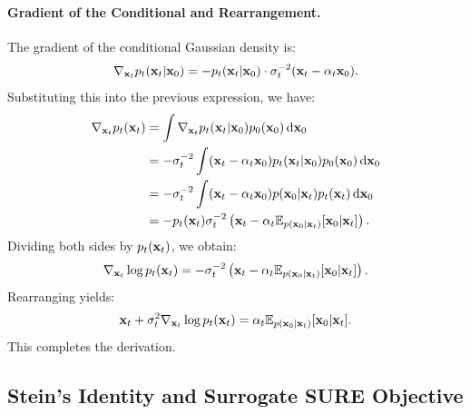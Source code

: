 \paragraph{Gradient of the Conditional and Rearrangement.}
The gradient of the conditional Gaussian density is:
\begin{align*}
\nabla_{{\mathbf{x}}_t} p_t({\mathbf{x}}_t|{\mathbf{x}}_0) 
= -p_t({\mathbf{x}}_t|{\mathbf{x}}_0) \cdot \sigma_t^{-2} ({\mathbf{x}}_t - \alpha_t {\mathbf{x}}_0).
\end{align*}
Substituting this into the previous expression, we have:
\begin{align*}
\nabla_{{\mathbf{x}}_t} p_t({\mathbf{x}}_t) 
&= \int \nabla_{{\mathbf{x}}_t} p_t({\mathbf{x}}_t|{\mathbf{x}}_0)  p_0({\mathbf{x}}_0)  \mathop{}\!\mathrm{d}{\mathbf{x}}_0 \\
&= -\sigma_t^{-2} \int ({\mathbf{x}}_t - \alpha_t {\mathbf{x}}_0)  p_t({\mathbf{x}}_t|{\mathbf{x}}_0)  p_0({\mathbf{x}}_0)  \mathop{}\!\mathrm{d}{\mathbf{x}}_0 \\
&= -\sigma_t^{-2} \int ({\mathbf{x}}_t - \alpha_t {\mathbf{x}}_0)  p({\mathbf{x}}_0|{\mathbf{x}}_t)  p_t({\mathbf{x}}_t)  \mathop{}\!\mathrm{d}{\mathbf{x}}_0 \\
&= -p_t({\mathbf{x}}_t)  \sigma_t^{-2} \left({\mathbf{x}}_t - \alpha_t  \mathbb{E}_{p({\mathbf{x}}_0|{\mathbf{x}}_t)}[{\mathbf{x}}_0\vert {\mathbf{x}}_t] \right).
\end{align*}
Dividing both sides by $p_t({\mathbf{x}}_t)$, we obtain:
\begin{align*}
\nabla_{{\mathbf{x}}_t} \log p_t({\mathbf{x}}_t) 
= -\sigma_t^{-2} \left({\mathbf{x}}_t - \alpha_t  \mathbb{E}_{p({\mathbf{x}}_0|{\mathbf{x}}_t)}[{\mathbf{x}}_0\vert {\mathbf{x}}_t] \right).
\end{align*}
Rearranging yields:
\begin{align*}
{\mathbf{x}}_t + \sigma_t^{2} \nabla_{{\mathbf{x}}_t} \log p_t({\mathbf{x}}_t) 
= \alpha_t  \mathbb{E}_{p({\mathbf{x}}_0|{\mathbf{x}}_t)}[{\mathbf{x}}_0\vert {\mathbf{x}}_t].
\end{align*}
This completes the derivation.

\subsection{Stein’s Identity and Surrogate SURE Objective}\label{app-sec:stein-identity}

